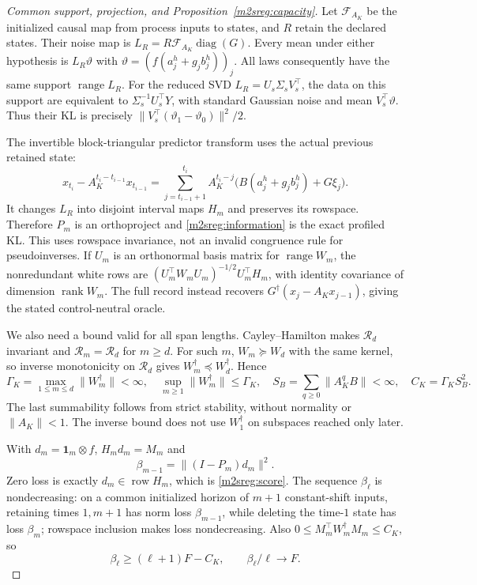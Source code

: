 \documentclass[11pt]{article}
\begin{document}
\begin{proof}[Common support, projection, and Proposition~\ref{m2sreg:capacity}]
Let $\mathcal F_{A_K}$ be the initialized causal map from process
inputs to states, and $R$ retain the declared states. Their noise map is
$L_R=R\mathcal F_{A_K}\operatorname{diag}(G)$.
Every mean under either hypothesis is $L_R\vartheta$ with
$\vartheta=(f(a_j^h+g_jb_j^h))_j$. All laws consequently have the
same support $\operatorname{range}L_R$.
For the reduced SVD $L_R=U_s\Sigma_sV_s^\top$, the data on this support
are equivalent to $\Sigma_s^{-1}U_s^\top Y$, with standard Gaussian
noise and mean $V_s^\top\vartheta$. Thus their KL is precisely
$\|V_s^\top(\vartheta_1-\vartheta_0)\|^2/2$.

The invertible block-triangular predictor transform uses the actual
previous retained state:
\[
x_{t_i}-A_K^{t_i-t_{i-1}}x_{t_{i-1}}
=\sum_{j=t_{i-1}+1}^{t_i}A_K^{t_i-j}
 \bigl(B(a_j^h+g_jb_j^h)+G\xi_j\bigr).
\]
It changes $L_R$ into disjoint interval maps $H_m$ and preserves its
rowspace. Therefore $P_m$ is an orthoproject and
\eqref{m2sreg:information} is the exact profiled KL.
This uses rowspace invariance, not an invalid congruence rule for
pseudoinverses. If $U_m$ is an orthonormal basis matrix for $\operatorname{range}W_m$, the
nonredundant white rows are
$(U_m^\top W_mU_m)^{-1/2}U_m^\top H_m$, with identity covariance
of dimension $\operatorname{rank}W_m$.
The full record instead recovers
$G^\dagger(x_j-A_Kx_{j-1})$, giving the stated control-neutral oracle.

We also need a bound valid for all span lengths.
Cayley--Hamilton makes $\mathcal R_d$ invariant and
$\mathcal R_m=\mathcal R_d$ for $m\ge d$.
For such $m$, $W_m\succeq W_d$ with the same kernel, so inverse
monotonicity on $\mathcal R_d$ gives $W_m^\dagger\preceq W_d^\dagger$.
Hence
\begin{equation}\label{m2sreg:gamma}
\Gamma_K=\max_{1\le m\le d}\|W_m^\dagger\|<\infty,\quad
\sup_{m\ge1}\|W_m^\dagger\|\le\Gamma_K,\quad
S_B=\sum_{q\ge0}\|A_K^qB\|<\infty,\quad C_K=\Gamma_KS_B^2 .
\end{equation}
The last summability follows from strict stability, without normality
or $\|A_K\|<1$. The inverse bound does not use $W_1^\dagger$ on
subspaces reached only later.

With $d_m=\mathbf1_m\otimes f$, $H_md_m=M_m$ and
\[
\beta_{m-1}=\|(I-P_m)d_m\|^2.
\]
Zero loss is exactly $d_m\in\operatorname{row}H_m$, which is
\eqref{m2sreg:score}.
The sequence $\beta_\ell$ is nondecreasing: on a common initialized
horizon of $m+1$ constant-shift inputs, retaining times $1,m+1$
has norm loss $\beta_{m-1}$, while deleting the time-$1$ state has
loss $\beta_m$; rowspace inclusion makes loss nondecreasing.
Also $0\le M_m^\top W_m^\dagger M_m\le C_K$, so
\begin{equation}\label{m2sreg:tail}
\beta_\ell\ge(\ell+1)F-C_K,\qquad \beta_\ell/\ell\longrightarrow F.
\end{equation}


\end{proof}
\end{document}
